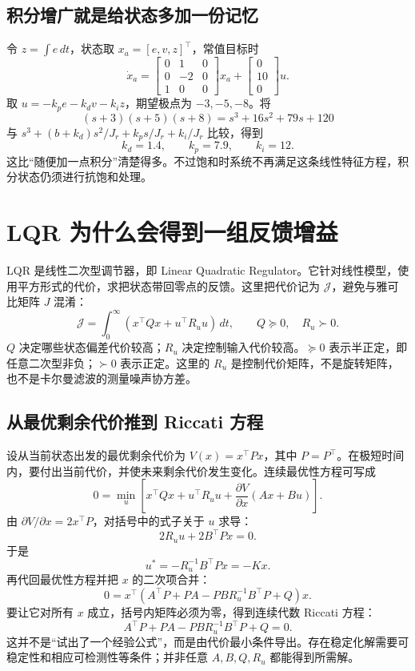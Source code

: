 \subsection{积分增广就是给状态多加一份记忆}

令 $z=\int e\,dt$，状态取 $x_a=[e,v,z]^\top$，常值目标时
\[
\dot x_a=
\begin{bmatrix}0&1&0\\0&-2&0\\1&0&0\end{bmatrix}x_a
+\begin{bmatrix}0\\10\\0\end{bmatrix}u.
\]
取 $u=-k_pe-k_dv-k_iz$，期望极点为 $-3,-5,-8$。将
\[
(s+3)(s+5)(s+8)=s^3+16s^2+79s+120
\]
与 $s^3+(b+k_d)s^2/J_r+k_ps/J_r+k_i/J_r$ 比较，得到
\[
k_d=1.4,\qquad k_p=7.9,\qquad k_i=12.
\]
这比“随便加一点积分”清楚得多。不过饱和时系统不再满足这条线性特征方程，积分状态仍须进行抗饱和处理。

\section{LQR 为什么会得到一组反馈增益}

LQR 是线性二次型调节器，即 Linear Quadratic Regulator。它针对线性模型，使用平方形式的代价，求把状态带回零点的反馈。这里把代价记为 $\mathcal J$，避免与雅可比矩阵 $J$ 混淆：
\begin{equation}
\mathcal J=\int_0^\infty (x^\top Qx+u^\top R_uu)\,dt,
\qquad Q\succeq0,\quad R_u\succ0.
\end{equation}
$Q$ 决定哪些状态偏差代价较高；$R_u$ 决定控制输入代价较高。$\succeq0$ 表示半正定，即任意二次型非负；$\succ0$ 表示正定。这里的 $R_u$ 是控制代价矩阵，不是旋转矩阵，也不是卡尔曼滤波的测量噪声协方差。

\subsection{从最优剩余代价推到 Riccati 方程}

设从当前状态出发的最优剩余代价为 $V(x)=x^\top Px$，其中 $P=P^\top$。在极短时间内，要付出当前代价，并使未来剩余代价发生变化。连续最优性方程可写成
\[
0=\min_u\left[x^\top Qx+u^\top R_uu+
\frac{\partial V}{\partial x}(Ax+Bu)\right].
\]
由 $\partial V/\partial x=2x^\top P$，对括号中的式子关于 $u$ 求导：
\[
2R_uu+2B^\top Px=0.
\]
于是
\begin{equation}
u^*=-R_u^{-1}B^\top Px=-Kx.
\end{equation}
再代回最优性方程并把 $x$ 的二次项合并：
\[
0=x^\top\left(A^\top P+PA-PBR_u^{-1}B^\top P+Q\right)x.
\]
要让它对所有 $x$ 成立，括号内矩阵必须为零，得到连续代数 Riccati 方程：
\begin{equation}
A^\top P+PA-PBR_u^{-1}B^\top P+Q=0.
\label{eq:cf_care}
\end{equation}
这并不是“试出了一个经验公式”，而是由代价最小条件导出。存在稳定化解需要可稳定性和相应可检测性等条件；并非任意 $A,B,Q,R_u$ 都能得到所需解。

